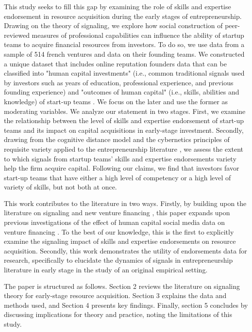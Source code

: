 \documentclass[12pt]{article}
\begin{document}
This study seeks to fill this gap by examining the role of skills and expertise endorsement in resource acquisition during the early stages of entrepreneurship. Drawing on the theory of signaling, we explore how social construction of peer-reviewed measures of professional capabilities can influence the ability of startup teams to acquire financial resources from investors. To do so, we use data from a sample of 514 french ventures and data on their founding teams. We constructed a unique dataset that includes online reputation founders data that can be classified into "human capital investments" (i.e., common traditional signals used by investors such as years of education, professional experience, and previous founding experience) and "outcomes of human capital" (i.e., skills, abilities and knowledge) of start-up teams \citep{marvel2016human}. We focus on the later and use the former as moderating variables. We analyze our statement in two stages. First, we examine the relationship between the level of skills and expertise endorsement of start-up teams and its impact on capital acquisitions in early-stage investment. Secondly, drawing from the cognitive distance model \citep{nooteboom2007optimal} and the cybernetics principles of requisite variety applied to the entrepreneurship literature \citep{ashby1957introduction, harrison2007s}, we assess the extent to which signals from startup teams' skills and expertise endorsements variety help the firm acquire capital. Following our claims, we find that investors favor start-up teams that have either a high level of competency or a high level of variety of skills, but not both at once.

This work contributes to the literature in two ways. Firstly, by building upon the literature on signaling and new venture financing \citep{colombo2021use, drover2017review, klein2020start}, this paper expands upon previous investigations of the effect of human capital social media data on venture financing \citep{banerji2019startup, marvel2016human, mollick2014dynamics, reese2020should}. To the best of our knowledge, this is the first to explicitly examine the signaling impact of skills and expertise endorsements on resource acquisition. Secondly, this work demonstrates the utility of endorsements data for research, specifically to elucidate the dynamics of signals in entrepreneurship literature in early stage in the study of an original empirical setting.

The paper is structured as follows. Section 2 reviews the literature on signaling theory for early-stage resource acquisition. Section 3 explains the data and methods used, and Section 4 presents key findings. Finally, section 5 concludes by discussing implications for theory and practice, noting the limitations of this study.
\end{document}
